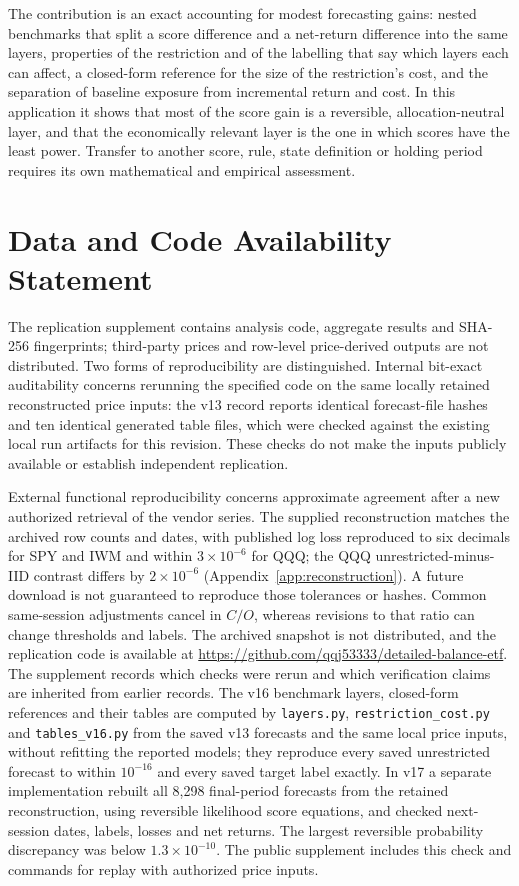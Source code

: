 The contribution is an exact accounting for modest forecasting gains: nested benchmarks that split a score difference and a net-return difference into the same layers, properties of the restriction and of the labelling that say which layers each can affect, a closed-form reference for the size of the restriction's cost, and the separation of baseline exposure from incremental return and cost. In this application it shows that most of the score gain is a reversible, allocation-neutral layer, and that the economically relevant layer is the one in which scores have the least power. Transfer to another score, rule, state definition or holding period requires its own mathematical and empirical assessment.

\section*{Data and Code Availability Statement}
The replication supplement contains analysis code, aggregate results and SHA-256 fingerprints; third-party prices and row-level price-derived outputs are not distributed. Two forms of reproducibility are distinguished. Internal bit-exact auditability concerns rerunning the specified code on the same locally retained reconstructed price inputs: the v13 record reports identical forecast-file hashes and ten identical generated table files, which were checked against the existing local run artifacts for this revision. These checks do not make the inputs publicly available or establish independent replication.

External functional reproducibility concerns approximate agreement after a new authorized retrieval of the vendor series. The supplied reconstruction matches the archived row counts and dates, with published log loss reproduced to six decimals for SPY and IWM and within $3\times10^{-6}$ for QQQ; the QQQ unrestricted-minus-IID contrast differs by $2\times10^{-6}$ (Appendix~\ref{app:reconstruction}). A future download is not guaranteed to reproduce those tolerances or hashes. Common same-session adjustments cancel in $C/O$, whereas revisions to that ratio can change thresholds and labels. The archived snapshot is not distributed, and the replication code is available at \url{https://github.com/qqj53333/detailed-balance-etf}. The supplement records which checks were rerun and which verification claims are inherited from earlier records. The v16 benchmark layers, closed-form references and their tables are computed by \texttt{layers.py}, \texttt{restriction\_cost.py} and \texttt{tables\_v16.py} from the saved v13 forecasts and the same local price inputs, without refitting the reported models; they reproduce every saved unrestricted forecast to within $10^{-16}$ and every saved target label exactly. In v17 a separate implementation rebuilt all 8,298 final-period forecasts from the retained reconstruction, using reversible likelihood score equations, and checked next-session dates, labels, losses and net returns. The largest reversible probability discrepancy was below $1.3\times10^{-10}$. The public supplement includes this check and commands for replay with authorized price inputs.

